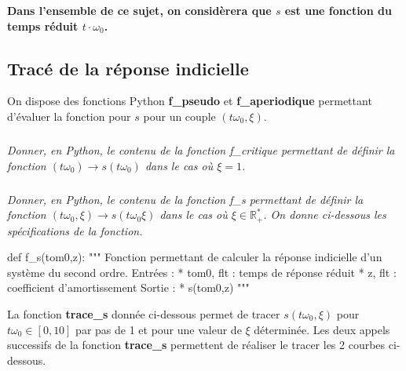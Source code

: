 \documentclass[10pt]{article}
\begin{document}
\begin{center}
\textbf{Dans l'ensemble de ce sujet, on considèrera que $s$ est une fonction du temps réduit $t\cdot\omega_0$.}
\end{center}


\subsection*{Tracé de la réponse indicielle}

On dispose des fonctions Python \textbf{\textsf{f\_pseudo}} et \textbf{\textsf{f\_aperiodique}} permettant d'évaluer la fonction pour $s$ pour un couple $(t\omega_0,\xi)$.

\subparagraph{} \textit{Donner, en Python, le contenu de la fonction \textsf{f\_critique} permettant de définir la fonction $(t\omega_0) \rightarrow s(t\omega_0)$ dans le cas où $\xi=1$.}


\subparagraph{} \textit{Donner, en Python, le contenu de la fonction \textsf{f\_s} permettant de définir la fonction $(t\omega_0,\xi) \rightarrow s(t\omega_0\xi)$ dans le cas où $\xi\in \mathbb{R}_+^*$. On donne ci-dessous les spécifications de la fonction.}

\begin{py}
\begin{python}
def f_s(tom0,z):
    """
    Fonction permettant de calculer la réponse indicielle d'un système du second ordre. 
    Entrées : 
        * tom0, flt : temps de réponse réduit
        * z, flt : coefficient d'amortissement
    Sortie : 
        * s(tom0,z)
    """
\end{python}
\end{py}


La fonction \textbf{\textsf{trace\_s}} donnée ci-dessous permet de tracer $s(t\omega_0,\xi)$ pour $t\omega_0 \in [0,10]$ par pas de 1 et pour une valeur de $\xi$ déterminée. Les deux appels successifs de la fonction \textbf{\textsf{trace\_s}} permettent de réaliser le tracer les 2 courbes ci-dessous.
\end{document}
